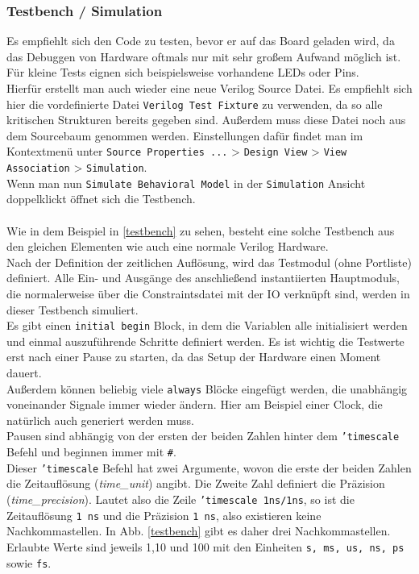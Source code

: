 \subsubsection{Testbench / Simulation}
Es empfiehlt sich den Code zu testen, bevor er auf das Board geladen wird, da das Debuggen von Hardware oftmals nur mit sehr großem Aufwand möglich ist. Für kleine Tests eignen sich beispielsweise vorhandene LEDs oder Pins.\\
Hierfür erstellt man auch wieder eine neue Verilog Source Datei. Es empfiehlt sich hier die vordefinierte Datei \texttt{Verilog Test Fixture} zu verwenden, da so alle kritischen Strukturen bereits gegeben sind. Außerdem muss diese Datei noch aus dem Sourcebaum genommen werden. Einstellungen dafür findet man im Kontextmenü unter \texttt{Source Properties ...} > \texttt{Design View} > \texttt{View Association} > \texttt{Simulation}. \\
Wenn man nun \texttt{Simulate Behavioral Model} in der \texttt{Simulation} Ansicht doppelklickt öffnet sich die Testbench.
\\ \\
Wie in dem Beispiel in \ref{testbench} zu sehen, besteht eine solche Testbench aus den gleichen Elementen wie auch eine normale Verilog Hardware. \\
Nach der Definition der zeitlichen Auflösung, wird das Testmodul (ohne Portliste) definiert. Alle Ein- und Ausgänge des anschließend instantiierten Hauptmoduls, die normalerweise über die Constraintsdatei mit der IO verknüpft sind, werden in dieser Testbench simuliert. \\
Es gibt einen \texttt{initial begin} Block, in dem die Variablen alle initialisiert werden und einmal auszuführende Schritte definiert werden. Es ist wichtig die Testwerte erst nach einer Pause zu starten, da das Setup der Hardware einen Moment dauert. \\
Außerdem können beliebig viele \texttt{always} Blöcke eingefügt werden, die unabhängig voneinander Signale immer wieder ändern. Hier am Beispiel einer Clock, die natürlich auch generiert werden muss. \\
Pausen sind abhängig von der ersten der beiden Zahlen hinter dem \texttt{'timescale} Befehl und beginnen immer mit \texttt{\#}. \\
Dieser \texttt{'timescale} Befehl hat zwei Argumente, wovon die erste der beiden Zahlen die Zeitauflösung (\emph{time\_unit}) angibt. Die Zweite Zahl definiert die Präzision (\emph{time\_precision}). Lautet also die Zeile \texttt{'timescale 1ns/1ns}, so ist die Zeitauflösung \texttt{1\,ns} und die Präzision \texttt{1\,ns}, also existieren keine Nachkommastellen. In Abb. \ref{testbench} gibt es daher drei Nachkommastellen. Erlaubte Werte sind jeweils 1,10 und 100 mit den Einheiten \texttt{s, ms, us, ns, ps} sowie \texttt{fs}.\\
